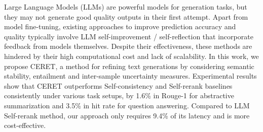 Large Language Models (LLMs) are powerful models for generation tasks, but they may not generate good quality outputs in their first attempt. Apart from model fine-tuning, existing approaches to improve prediction accuracy and quality typically involve LLM self-improvement / self-reflection that incorporate feedback from models themselves. Despite their effectiveness, these methods are hindered by their high computational cost and lack of scalability. In this work, we propose CERET, a method for refining text generations by considering semantic stability, entailment and inter-sample uncertainty measures. Experimental results show that CERET outperforms Self-consistency and Self-rerank baselines consistently under various task setups, by 1.6\% in Rouge-1 for abstractive summarization and 3.5\% in hit rate for question answering. Compared to LLM Self-rerank method, our approach only requires 9.4\% of its latency and is more cost-effective.